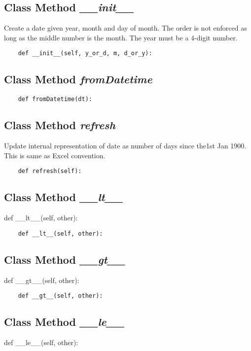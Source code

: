 \documentclass[twoside,11pt]{book}
\begin{document}
\subsection{Class Method {\it \_\_init\_\_}}
Create a date given year, month and day of month. The order is not enforced as long as the middle number is the month. The year must be a 4-digit number. 

\begin{lstlisting}
    def __init__(self, y_or_d, m, d_or_y):
\end{lstlisting}

\subsection{Class Method {\it fromDatetime}}


\begin{lstlisting}
    def fromDatetime(dt):
\end{lstlisting}

\subsection{Class Method {\it refresh}}
Update internal representation of date as number of days since the1st Jan 1900. This is same as Excel convention. 

\begin{lstlisting}
    def refresh(self):
\end{lstlisting}

\subsection{Class Method {\it \_\_lt\_\_}}
def \_\_lt\_\_(self, other):

\begin{lstlisting}
    def __lt__(self, other):
\end{lstlisting}

\subsection{Class Method {\it \_\_gt\_\_}}
def \_\_gt\_\_(self, other):

\begin{lstlisting}
    def __gt__(self, other):
\end{lstlisting}

\subsection{Class Method {\it \_\_le\_\_}}
def \_\_le\_\_(self, other):
\end{document}
